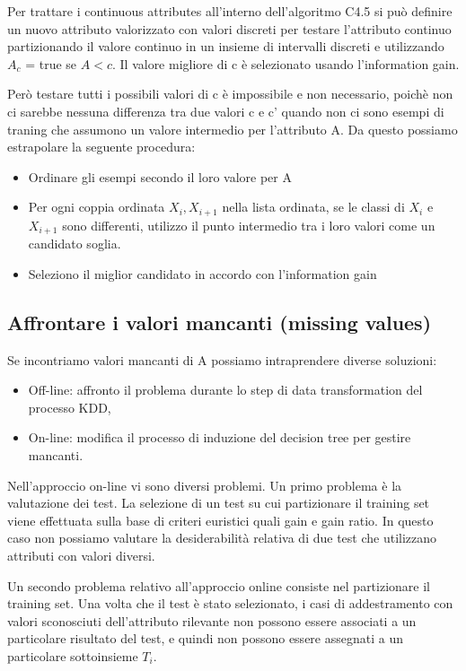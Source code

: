 \documentclass[a4paper]{extarticle}
\begin{document}
Per trattare i continuous attributes all'interno dell'algoritmo C4.5 si può definire un nuovo attributo valorizzato con valori discreti per testare l'attributo continuo partizionando il valore continuo in un insieme di intervalli discreti e utilizzando $A_c$ = true se $A<c$. Il valore migliore di c è selezionato usando l'information gain.

Però testare tutti i possibili valori di c è impossibile e non necessario, poichè non ci sarebbe nessuna differenza tra due valori c e c' quando non ci sono esempi di traning che assumono un valore intermedio per l'attributo A. Da questo possiamo estrapolare la seguente procedura:

\begin{itemize}
\item Ordinare gli esempi secondo il loro valore per A
\item Per ogni coppia ordinata $X_i,X_{i+1}$ nella lista ordinata, se le classi di $X_i$ e $X_{i+1}$ sono differenti, utilizzo il punto intermedio tra i loro valori come un candidato soglia.
\item Seleziono il miglior candidato in accordo con l'information gain
\end{itemize}

\subsection{Affrontare i valori mancanti (missing values)}

Se incontriamo valori mancanti di A possiamo intraprendere diverse soluzioni:
\begin{itemize}
\item Off-line: affronto il problema durante lo step di data transformation del processo KDD,
\item On-line: modifica il processo di induzione del decision tree per gestire mancanti.
\end{itemize}

Nell'approccio on-line vi sono diversi problemi. Un primo problema è la valutazione dei test. La selezione di un test su cui partizionare il training set viene effettuata sulla base di criteri euristici quali gain e gain ratio. In questo caso non possiamo valutare la desiderabilità relativa di due test che utilizzano attributi con valori diversi.

Un secondo problema relativo all'approccio online consiste nel partizionare il training set. Una volta che il test è stato selezionato, i casi di addestramento con valori sconosciuti dell'attributo rilevante non possono essere associati a un particolare risultato del test, e quindi non possono essere assegnati a un particolare sottoinsieme $T_i$.
\end{document}
